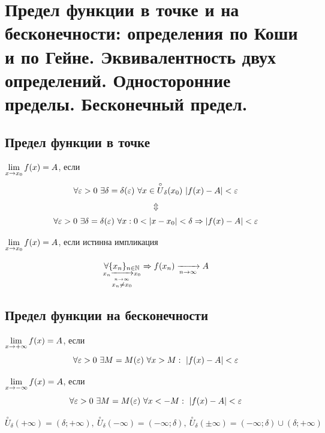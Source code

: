 \section{Предел функции в точке и на бесконечности: определения по Коши и по Гейне. Эквивалентность двух определений. Односторонние пределы. Бесконечный предел.}

\subsection{Предел функции в точке}

\begin{definition}
    $\lim\limits_{x \to x_0} f(x) = A$, если
    \[
        \forall \varepsilon > 0\ \exists \delta = \delta (\varepsilon )\ \forall x \in \overset{\circ}{U}_{\delta } (x_0)\ |f(x) - A| < \varepsilon
    \]
    \[
        \Updownarrow
    \]
    \[
        \forall \varepsilon > 0\ \exists \delta = \delta (\varepsilon )\ \forall x : 0 < |x - x_0| < \delta \Rightarrow |f(x) - A| < \varepsilon
    \]
\end{definition}

\begin{definition}
    $\lim\limits_{x \to x_0} f(x) = A$, если истинна импликация

    \[
    \underset{
        \substack{
            x_n \xrightarrow[n \to \infty]{} x_0 \\ 
            x_n \neq x_0
        }
    }{\forall \{x_n\}_{n \in \mathbb{N}}} 
    \Rightarrow f(x_n) \xrightarrow[n \to \infty]{} A
    \]
\end{definition}

\subsection{Предел функции на бесконечности}

\begin{definition}
    $\lim\limits_{x \to +\infty} f(x) = A$, если
    \[
        \forall \eps > 0\ 
        \exists M = M(\eps)\ 
        \forall x > M:\ 
        |f(x) - A| < \eps
    \]
\end{definition}

\begin{definition}
    $\lim\limits_{x \to -\infty} f(x) = A$, если
    \[
        \forall \eps > 0\ 
        \exists M = M(\eps)\ 
        \forall x < -M:\ 
        |f(x) - A| < \eps
    \]
\end{definition}

\begin{remark}
    \[
        \overset{\circ}{U}_{\delta } (+\infty ) = (\delta; +\infty ),\ \overset{\circ}{U}_{\delta } (-\infty ) = (-\infty; \delta ),\ \overset{\circ}{U}_{\delta } (\pm\infty ) = (-\infty; \delta ) \cup (\delta; +\infty )
    \]
\end{remark}


